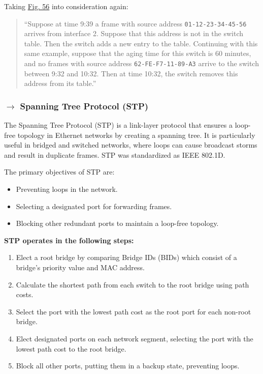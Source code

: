 \noindent Taking \hyperref[fig:switch-action]{Fig. 56} into consideration again:

\begin{quote}
     ``Suppose at time 9:39 a frame with source address \texttt{01-12-23-34-45-56} arrives from interface 2. Suppose that this address is not in the switch table. Then the switch adds a new entry to the table. Continuing with this same example, suppose that the aging time for this switch is 60 minutes, and no frames with source address \texttt{62-FE-F7-11-89-A3} arrive to the switch between 9:32 and 10:32. Then at time 10:32, the switch removes this address from its table.''\cite{Kurose2017}
\end{quote}

\clearpage
\subsubsection[5.5.2 Spanning Tree Protocol (STP)]{$\rightarrow$ Spanning Tree Protocol (STP)}

\noindent The Spanning Tree Protocol (STP) is a link-layer protocol that ensures a loop-free topology in Ethernet networks by creating a spanning tree. It is particularly useful in bridged and switched networks, where loops can cause broadcast storms and result in duplicate frames. STP was standardized as IEEE 802.1D.

\vspace{0.5 em}
\noindent The primary objectives of STP are:
\begin{itemize}[noitemsep, nolistsep]
    \item Preventing loops in the network.
    \item Selecting a designated port for forwarding frames.
    \item Blocking other redundant ports to maintain a loop-free topology.
\end{itemize}

\vspace{0.25 em}
\begin{mdframed}
    \noindent \textbf{STP operates in the following steps:}
    \begin{enumerate}
        \item Elect a root bridge by comparing Bridge IDs (BIDs) which consist of a bridge's priority value and MAC address.
        \item Calculate the shortest path from each switch to the root bridge using path costs.
        \item Select the port with the lowest path cost as the root port for each non-root bridge.
        \item Elect designated ports on each network segment, selecting the port with the lowest path cost to the root bridge.
        \item Block all other ports, putting them in a backup state, preventing loops.
    \end{enumerate}
\end{mdframed}

